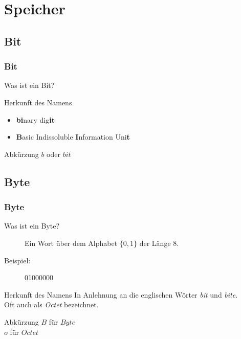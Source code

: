 \section{Speicher}
\subsection{Bit}
\begin{frame}
	\frametitle{Bit}
	\begin{description}
		\item[Was ist ein Bit?] 
	\end{description}
	\pause
	\pause
	\begin{block}{Herkunft des Namens}
		\begin{itemize}
			\item \textbf{bi}nary dig\textbf{it}
			\item \textbf{B}asic Indissoluble \textbf{I}nformation Uni\textbf{t}
		\end{itemize}
	\end{block}
	\pause
	\begin{block}{Abkürzung}
		$b$ oder $bit$
	\end{block}
\end{frame}

\subsection{Byte}
\begin{frame}
	\frametitle{Byte}
	\begin{description}
		\item[Was ist ein Byte?] Ein Wort über dem Alphabet $\{0,1\}$ der Länge 8.
    \item[Beispiel:] 01000000
  \end{description}
	\pause
	\begin{block}{Herkunft des Namens}
		In Anlehnung an die englischen Wörter \textit{bit} und \textit{bite}.\\
		Oft auch als \textit{Octet} bezeichnet.
	\end{block}
	\pause
	\begin{block}{Abkürzung}
		$B$ für $Byte$\\
		$o$ für $Octet$\\
	\end{block}
\end{frame}

